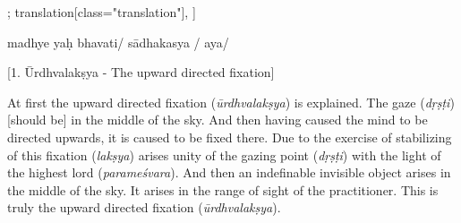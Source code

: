 \documentclass[12pt]{article}%
\def\om{\textrm{\footnotesize \textit{omitted in}\ }} %
\begin{document}
\begin{alignment}[
    texts=edition[class="edition"];
    translation[class="translation"],
  ]
\begin{edition}
\begin{prose}
madhye
yaḥ
bhavati/ 
\app{\lem[wit={E,P,D1,N1,U1}]{sa}
  \rdg[wit={L,B,N2,U2}]{\om}}
sādhakasya
/
aya/
\end{prose}
\end{edition}
\begin{translation}
     \bigskip
    \centerline{\textrm{\small{[1. Ūrdhvalakṣya - The upward directed fixation]}}}
    \bigskip    
  \begin{tlate}
At first the upward directed fixation (\textit{ūrdhvalakṣya}) is explained. The gaze (\textit{dṛṣṭi}) [should be] in the middle of the sky. And then having caused the mind to be directed upwards, it is caused to be fixed there. Due to the exercise of stabilizing of this fixation (\textit{lakṣya}) arises unity of the gazing point (\textit{dṛṣṭi}) with the light of the highest lord (\textit{parameśvara}). And then an indefinable invisible object arises in the middle of the sky. It arises in the range of sight of the practitioner. This is truly the upward directed fixation (\textit{ūrdhvalakṣya}).

\end{tlate}
\end{translation}
\end{alignment}
\end{document}

